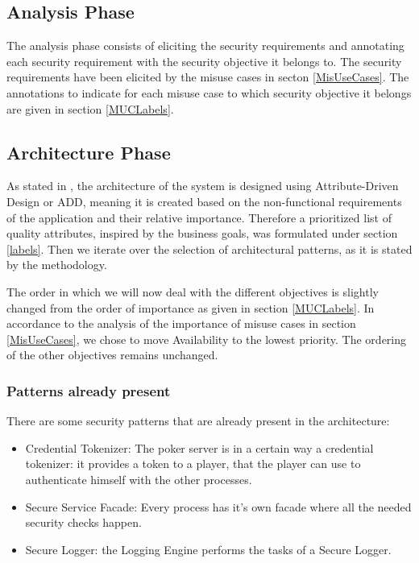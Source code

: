 \documentclass[a4paper,11pt]{report}
\begin{document}
\subsection{Analysis Phase}
The analysis phase consists of eliciting the security requirements and annotating each
security requirement with the security objective it belongs to. The security requirements have been elicited by the misuse cases
in secton \ref{MisUseCases}. The annotations to indicate for each misuse case to which security objective it belongs
are given in section \ref{MUCLabels}.

\subsection{Architecture Phase}
As stated in \cite[p13]{yskout}, the architecture of the system is designed using Attribute-Driven Design or ADD,
meaning it is created based on the non-functional requirements of the application and their relative importance.
Therefore a prioritized list of quality attributes, inspired by the business goals, was formulated under
section \ref{labels}. Then we iterate over the selection of architectural patterns, as it is stated by the methodology.

The order in which we will now deal with the different objectives is slightly changed from the order of importance as given in section \ref{MUCLabels}. In accordance to the analysis of the importance of misuse cases in section \ref{MisUseCases}, we chose to move Availability to the lowest priority. The ordering of the other objectives remains unchanged.

\subsubsection{Patterns already present}
\label{pres_patterns}
There are some security patterns that are already present in the architecture:
\begin{itemize}
\item Credential Tokenizer: The poker server is in a certain way a credential tokenizer: it provides a token to a
player, that the player can use to authenticate himself with the other processes.
\item Secure Service Facade: Every process has it's own facade where all the needed
security checks happen.
\item Secure Logger: the Logging Engine performs the tasks of a Secure Logger.
\end{itemize}
\end{document}
